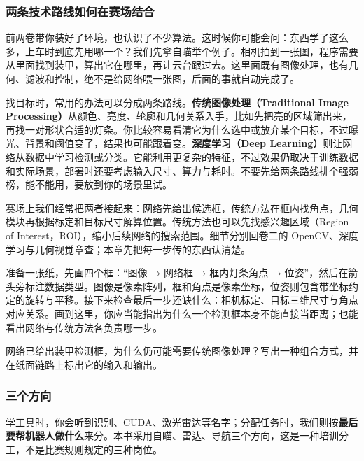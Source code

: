 \subsubsection{两条技术路线如何在赛场结合}

前两卷带你装好了环境，也认识了不少算法。这时候你可能会问：东西学了这么多，上车时到底先用哪一个？我们先拿自瞄举个例子。相机拍到一张图，程序需要从里面找到装甲，算出它在哪里，再让云台跟过去。这里面既有图像处理，也有几何、滤波和控制，绝不是给网络喂一张图，后面的事就自动完成了。

找目标时，常用的办法可以分成两条路线。\textbf{传统图像处理（Traditional Image Processing）}从颜色、亮度、轮廓和几何关系入手，比如先把亮的区域筛出来，再找一对形状合适的灯条。你比较容易看清它为什么选中或放弃某个目标，不过曝光、背景和阈值变了，结果也可能跟着变。\textbf{深度学习（Deep Learning）}则让网络从数据中学习检测或分类。它能利用更复杂的特征，不过效果仍取决于训练数据和实际场景，部署时还要考虑输入尺寸、算力与耗时。不要先给两条路线排个强弱榜，能不能用，要放到你的场景里试。

赛场上我们经常把两者接起来：网络先给出候选框，传统方法在框内找角点，几何模块再根据标定和目标尺寸解算位置。传统方法也可以先找感兴趣区域（Region of Interest，ROI），缩小后续网络的搜索范围。细节分别回卷二的 OpenCV、深度学习与几何视觉章查；本章先把每一步传的东西认清楚。

\begin{example}[把网络与几何接起来]
准备一张纸，先画四个框：“图像 → 网络框 → 框内灯条角点 → 位姿”，然后在箭头旁标注数据类型。图像是像素阵列，框和角点是像素坐标，位姿则包含带坐标约定的旋转与平移。接下来检查最后一步还缺什么：相机标定、目标三维尺寸与角点对应关系。画到这里，你应当能指出为什么一个检测框本身不能直接当距离；也能看出网络与传统方法各负责哪一步。
\end{example}

\begin{exercise}
\label{v3-ex-overview-1}
网络已给出装甲检测框，为什么仍可能需要传统图像处理？写出一种组合方式，并在纸面链路上标出它的输入和输出。
\end{exercise}

\subsubsection{三个方向}

学工具时，你会听到识别、CUDA、激光雷达等名字；分配任务时，我们则按\textbf{最后要帮机器人做什么}来分。本书采用自瞄、雷达、导航三个方向，这是一种培训分工，不是比赛规则规定的三种岗位。

